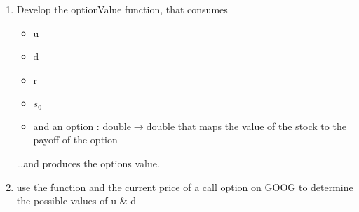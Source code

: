 \documentclass{article}
\begin{document}
\begin{enumerate}
\item Develop the optionValue function, that consumes
   \begin{itemize}
   \item u 
   \item d
   \item r 
   \item $s_0$
   \item and an option : $ \mathrm{double} \rightarrow \mathrm{double}$ 
         that maps the value of the stock to the payoff of the option

   \end{itemize}
   \ldots and produces the options value.

\item use the function and the current price of a call option on 
      GOOG to determine the possible values of u \& d

\end{enumerate}
\end{document}
